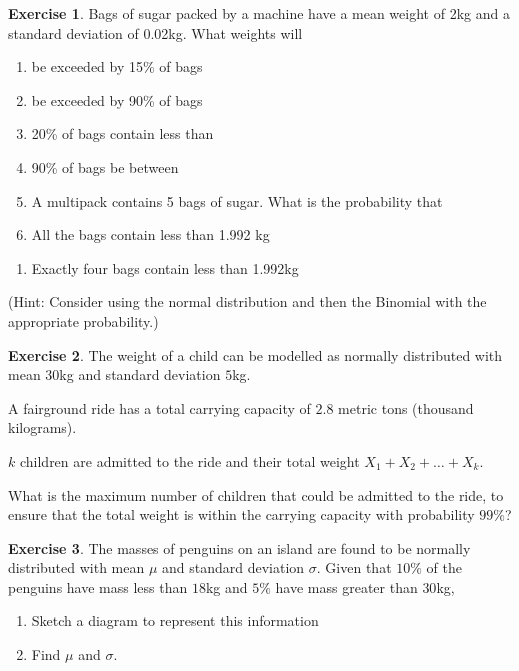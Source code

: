 \documentclass[
]{book}
\providecommand{\tightlist}{%
  \setlength{\itemsep}{0pt}\setlength{\parskip}{0pt}}
\theoremstyle{definition}
\theoremstyle{definition}
\theoremstyle{definition}
\newtheorem{exercise}{Exercise}[chapter]
\theoremstyle{definition}
\theoremstyle{remark}
\begin{document}
\begin{exercise}
Bags of sugar packed by a machine have a mean weight of 2kg and a standard
deviation of 0.02kg. What weights will

\begin{enumerate}
\def\labelenumi{\alph{enumi})}
\item
  be exceeded by 15\% of bags
\item
  be exceeded by 90\% of bags
\item
  20\% of bags contain less than
\item
  90\% of bags be between
\item
  A multipack contains 5 bags of sugar. What is the probability that
\item
  All the bags contain less than 1.992 kg
\end{enumerate}

\begin{enumerate}
\def\labelenumi{\roman{enumi})}
\setcounter{enumi}{1}
\tightlist
\item
  Exactly four bags contain less than 1.992kg
\end{enumerate}

(Hint: Consider using the normal distribution and then the Binomial
with the appropriate probability.)
\end{exercise}

\begin{exercise}
The weight of a child can be modelled as normally distributed with mean \(30\)kg and standard deviation \(5\)kg.

A fairground ride has a total carrying capacity of \(2.8\) metric tons (thousand kilograms).

\(k\) children are admitted to the ride and their total weight \(X_1+X_2+ \ldots + X_k\).

What is the maximum number of children that could be admitted to the ride, to ensure that the total weight is within the carrying capacity with probability \(99\%\)?
\end{exercise}

\begin{exercise}

The masses of penguins on an island are found to be normally distributed with mean \(\mu\) and standard deviation \(\sigma\). Given that \(10\%\) of the penguins have mass less than \(18\)kg and \(5\%\) have mass greater than \(30\)kg,

\begin{enumerate}
\def\labelenumi{\alph{enumi})}
\item
  Sketch a diagram to represent this information
\item
  Find \(\mu\) and \(\sigma\).
\end{enumerate}

\end{exercise}

  
\end{document}
